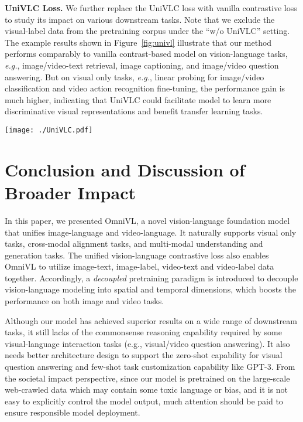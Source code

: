 \documentclass{article}
\makeatletter
\newcommand*{\system}{OmniVL\@\xspace}
\newcommand*{\eg}{\emph{e.g.}\@\xspace}
\makeatother
\begin{document}
\noindent \textbf{UniVLC Loss.} We further replace the UniVLC loss with vanilla contrastive loss to study its impact on various downstream tasks. Note that we exclude the visual-label data from the pretraining corpus under the ``w/o UniVLC'' setting. The example results shown in Figure~\ref{fig:univl} illustrate that our method performs comparably to vanilla contrast-based model on vision-language tasks, \eg, image/video-text retrieval, image captioning, and image/video question answering. But on visual only tasks, \eg, linear probing for image/video classification and video action recognition fine-tuning, the performance gain is much higher, indicating that UniVLC could facilitate model to learn more discriminative visual representations and benefit transfer learning tasks. 

\begin{figure*}[!ht]
  \centering
  \texttt{[image: ./UniVLC.pdf]}
  \vspace{-0.2in}
  \caption{Evaluation on different tasks w/ and w/o UniVLC. We report the text recall@1 on COCO retrieval, B@4 on COCO captioning, test-dev on VQA, recall@1 on MSRVTT(ret), accuracy on MSRVTT(QA), accuracy on CIFAR10, CIFAR100, UCF101 (linear probe), and K400(fine-tuned).}
  \label{fig:univl}
\end{figure*}

\section{Conclusion and Discussion of Broader Impact}
In this paper, we presented \system, a novel vision-language foundation model that unifies image-language and video-language. 
It naturally supports visual only tasks, cross-modal alignment tasks, and multi-modal understanding and generation tasks. The unified vision-language contrastive loss also enables \system to utilize image-text, image-label, video-text and video-label data together. Accordingly, a \emph{decoupled} pretraining paradigm is introduced to decouple vision-language modeling into spatial and temporal dimensions, which boosts the performance on both image and video tasks. 

Although our model has achieved superior results on a wide range of downstream tasks, it still lacks of the commonsense reasoning capability required by some visual-language interaction tasks (e.g., visual/video question answering). It also needs better architecture design to support the zero-shot capability for visual question answering and few-shot task customization capability like GPT-3. From the societal impact perspective, since our model is pretrained on the large-scale web-crawled data which may contain some toxic language or bias, and it is not easy to explicitly control the model output, much attention should be paid to ensure responsible model deployment. 
\end{document}
